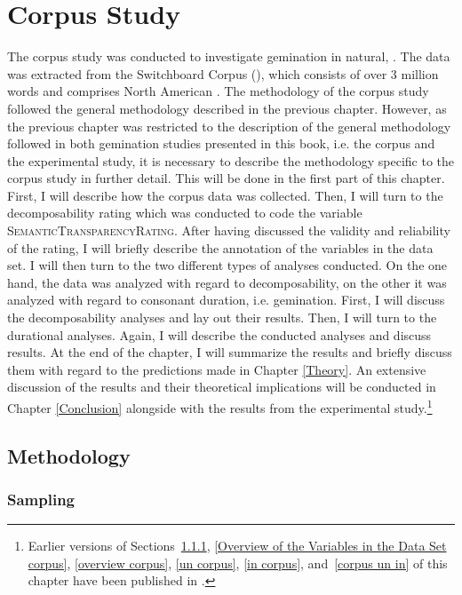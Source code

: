 \chapter {Corpus Study}
\label{Corpus Studies}


The corpus study was conducted to investigate {gemination} in natural, . 
The data was extracted from the Switchboard Corpus (\citealt{Godfrey.1997}), which consists of over 3 million words and comprises North American . 
The methodology of the corpus study followed the general methodology described in the previous chapter. However, as the previous chapter was restricted to the description of the general methodology followed in both {gemination} studies presented in this book, i.e. the corpus and the experimental study,  it is necessary to describe the methodology specific to the corpus study in further detail. This will be done in the first part of this chapter.
 First, I will describe how the corpus data was collected. Then, I will turn to the decomposability rating which was conducted to code the variable \textsc{SemanticTransparencyRating}. After having discussed the validity and reliability of the rating, I will briefly describe the annotation of the variables in the data set. I will then turn to the two different types of analyses conducted.
 On the one hand, the data was analyzed with regard to {decomposability}, on the other it was analyzed with regard to consonant duration, i.e. {gemination}. 
First, I will discuss the {decomposability} analyses and lay out their results. 
Then, I will turn to the durational analyses. Again, I will describe the conducted analyses and discuss results.  At the end of the chapter, I will summarize the results and briefly discuss them with regard to the predictions made in Chapter \ref{Theory}. An extensive discussion of the results and their theoretical implications will be conducted in Chapter \ref{Conclusion} alongside with the results from the experimental study.\footnote{Earlier versions of Sections~\ref{sampling corpus},  \ref{Overview of the Variables in the Data Set corpus}, \ref{overview corpus}, \ref{un corpus}, \ref{in corpus}, and~\ref{corpus un in} of this chapter have been published in \cite{BenHedia.2017}.} 


\section{Methodology}

\subsection{Sampling}\label{sampling corpus}

